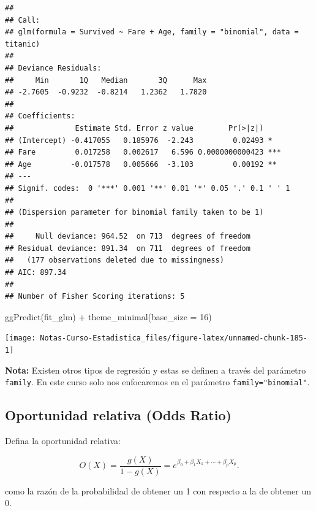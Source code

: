 \documentclass[
  12pt,
]{book}
\newenvironment{Shaded}{\begin{snugshade}}{\end{snugshade}}
\newcommand{\AttributeTok}[1]{\textcolor[rgb]{0.77,0.63,0.00}{#1}}
\newcommand{\DecValTok}[1]{\textcolor[rgb]{0.00,0.00,0.81}{#1}}
\newcommand{\FunctionTok}[1]{\textcolor[rgb]{0.00,0.00,0.00}{#1}}
\newcommand{\NormalTok}[1]{#1}
\newcommand{\SpecialCharTok}[1]{\textcolor[rgb]{0.00,0.00,0.00}{#1}}
\theoremstyle{definition}
\theoremstyle{definition}
\theoremstyle{definition}
\theoremstyle{definition}
\theoremstyle{remark}
\begin{document}
\begin{verbatim}
## 
## Call:
## glm(formula = Survived ~ Fare + Age, family = "binomial", data = titanic)
## 
## Deviance Residuals: 
##     Min       1Q   Median       3Q      Max  
## -2.7605  -0.9232  -0.8214   1.2362   1.7820  
## 
## Coefficients:
##              Estimate Std. Error z value        Pr(>|z|)    
## (Intercept) -0.417055   0.185976  -2.243         0.02493 *  
## Fare         0.017258   0.002617   6.596 0.0000000000423 ***
## Age         -0.017578   0.005666  -3.103         0.00192 ** 
## ---
## Signif. codes:  0 '***' 0.001 '**' 0.01 '*' 0.05 '.' 0.1 ' ' 1
## 
## (Dispersion parameter for binomial family taken to be 1)
## 
##     Null deviance: 964.52  on 713  degrees of freedom
## Residual deviance: 891.34  on 711  degrees of freedom
##   (177 observations deleted due to missingness)
## AIC: 897.34
## 
## Number of Fisher Scoring iterations: 5
\end{verbatim}

\begin{Shaded}
\begin{Highlighting}[]
\FunctionTok{ggPredict}\NormalTok{(fit\_glm) }\SpecialCharTok{+} \FunctionTok{theme\_minimal}\NormalTok{(}\AttributeTok{base\_size =} \DecValTok{16}\NormalTok{)}
\end{Highlighting}
\end{Shaded}

\begin{center}\texttt{[image: Notas-Curso-Estadistica\_files/figure-latex/unnamed-chunk-185-1]} \end{center}

\textbf{Nota:} Existen otros tipos de regresión y estas se definen a través del parámetro \texttt{family}. En este curso solo nos enfocaremos en el parámetro \texttt{family="binomial"}.

\hypertarget{oportunidad-relativa-odds-ratio}{%
\subsection{Oportunidad relativa (Odds Ratio)}\label{oportunidad-relativa-odds-ratio}}

Defina la oportunidad relativa:

\begin{equation*}
O(X) = \frac{g(X)}{1-g(X)} = e^{\beta_{0} +\beta_{1} X_{1} + \cdots + \beta_{p} X_{p}}.
\end{equation*}

como la razón de la probabilidad de obtener un 1 con respecto a la de obtener un 0.
\end{document}
